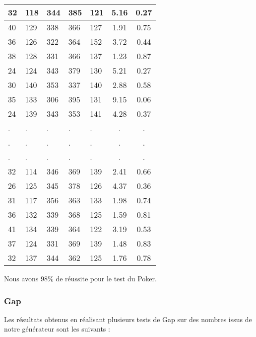 \documentclass[12pt,a4paper]{article}
\begin{document}
\begin{center}
\begin{tabular}{|l|l|l|l|l|c|c|}
32 & 118 & 344 & 385 & 121 &  5.16 &  0.27\\ \hline
40 & 129 & 338 & 366 & 127 &  1.91 &  0.75\\ \hline
36 & 126 & 322 & 364 & 152 &  3.72 &  0.44\\ \hline
38 & 128 & 331 & 366 & 137 &  1.23 &  0.87\\ \hline
24 & 124 & 343 & 379 & 130 &  5.21 &  0.27\\ \hline
30 & 140 & 353 & 337 & 140 &  2.88 &  0.58\\ \hline
35 & 133 & 306 & 395 & 131 &  9.15 &  0.06\\ \hline
24 & 139 & 343 & 353 & 141 &  4.28 &  0.37\\ \hline
 . & . & . & . & . & . & . \\ \hline
 . & . & . & . & . & . & . \\ \hline
 . & . & . & . & . & . & . \\ \hline
32 & 114 & 346 & 369 & 139 &  2.41 &  0.66\\ \hline
26 & 125 & 345 & 378 & 126 &  4.37 &  0.36\\ \hline
31 & 117 & 356 & 363 & 133 &  1.98 &  0.74\\ \hline
36 & 132 & 339 & 368 & 125 &  1.59 &  0.81\\ \hline
41 & 134 & 339 & 364 & 122 &  3.19 &  0.53\\ \hline
37 & 124 & 331 & 369 & 139 &  1.48 &  0.83\\ \hline
32 & 137 & 344 & 362 & 125 &  1.76 &  0.78\\ \hline
\end{tabular}
\end{center}
Nous avons $98\%$ de réussite pour le test du Poker.

\newpage
\subsubsection{Gap}

Les résultats obtenus en réalisant plusieurs tests de Gap sur des nombres issus
de notre générateur sont les suivants :
\end{document}
